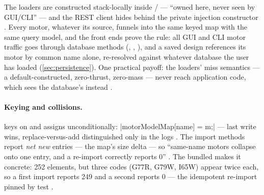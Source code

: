 \begin{designrule}
The loaders are constructed stack-locally inside
/ --- ``owned here, never seen by GUI/CLI''
 --- and the REST client hides behind the private
 injection constructor . Every
motor, whatever its source, funnels into the same keyed map with the same query model,
and the front ends prove the rule: all GUI and CLI motor traffic goes through database
methods (, ,
), and a saved design references its motor by common name alone,
re-resolved against whatever database the user has loaded
 (\cref{sec:persistence}). One practical payoff: the
loaders' miss semantics --- a default-constructed, zero-thrust, zero-mass
  --- never reach application code,
which sees the database's  instead
.
\end{designrule}

\paragraph{Keying and collisions.}  keys on 
and assigns unconditionally: \cppinline|motorModelMap[name] = m;|
 --- last write wins, replace-versus-add
distinguished only in the logs . The import methods
report \emph{net new} entries --- the map's size delta --- so ``same-name motors collapse
onto one entry, and a re-import correctly reports 0''
. The bundled  makes it
concrete: 252  elements, but three codes (G77R, G79W, I65W) appear twice
each, so a first import reports 249 and a second reports 0 --- the idempotent re-import
pinned by test .

